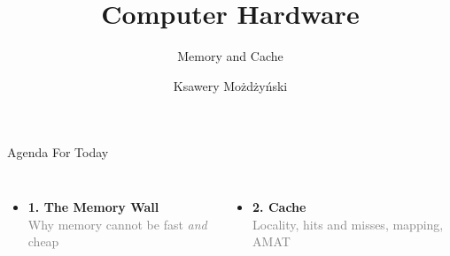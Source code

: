 \documentclass[aspectratio=169,10pt]{beamer}
\title{Computer Hardware}
\subtitle{Memory and Cache}
\author{Ksawery Możdżyński}
\date{}
\begin{document}
\begin{frame}
  \titlepage
\end{frame}

\begin{frame}{Agenda For Today}
  \begin{columns}[T,onlytextwidth]
      \large
      \begin{itemize}
        \item[\textcolor{DeepBlue}{\faLayerGroup}] \textbf{1. The Memory Wall} \\
        \textcolor{gray}{\small Why memory cannot be fast \emph{and} cheap}
      \end{itemize}
      \large
      \begin{itemize}
        \item[\textcolor{DeepBlue}{\faBolt}] \textbf{2. Cache} \\
        \textcolor{gray}{\small Locality, hits and misses, mapping, AMAT}
      \end{itemize}
  \end{columns}
\end{frame}
\end{document}

